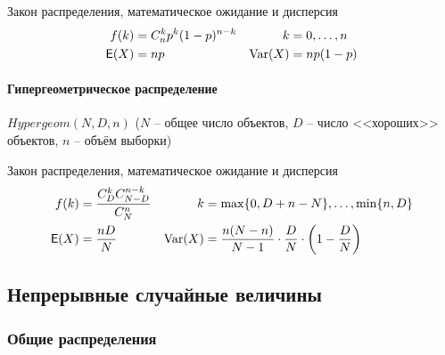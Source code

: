 Закон распределения, математическое ожидание и дисперсия
\begin{align*}
	f(k)&=C_n^k p^k(1-p)^{n-k} & k&=0,\ldots,n \\
	{\mathsf E}(X)&=np & \operatorname{Var}(X)&=np(1-p)
\end{align*}

\paragraph{Гипергеометрическое распределение} \(Hypergeom(N,D,n)\) (\(N\) -- общее число объектов,
\(D\) -- число <<хороших>> объектов, \(n\) -- объём выборки)

Закон распределения, математическое ожидание и дисперсия
\begin{align*}
	f(k)&=\frac{C_D^kC_{N-D}^{n-k}}{C_N^n}& k&=\max\{0, D+n-N\},\ldots,\min\{n,D\} \\
	{\mathsf E}(X)&=\frac{nD}{N} & \operatorname{Var}(X)&=\frac{n(N-n)}{N-1}\cdot\frac{D}{N}\cdot\left(1-\frac{D}{N}\right)
\end{align*}

\subsection{Непрерывные случайные величины}

\subsubsection{Общие распределения}

